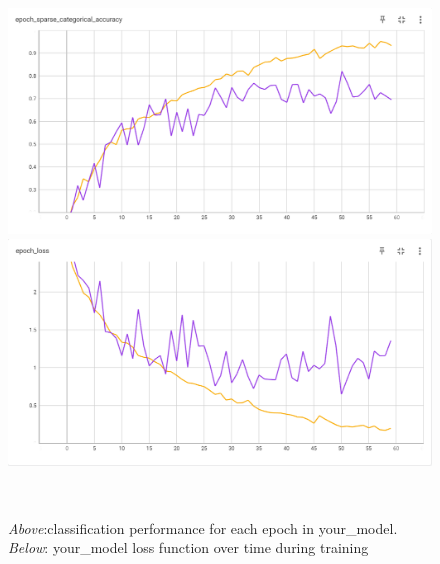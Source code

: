 \begin{figure}
    \centering
    \includegraphics[scale=0.35]{your_model_epoch_acc.png}
    \includegraphics[scale=0.35]{your_model_epoch_loss.png}
    \caption{\emph{Above}:classification performance for each epoch in your\_model. \emph{Below}: your\_model loss function over time during training}\
    \label{fig:your_model_epoch_results}
\end{figure}

